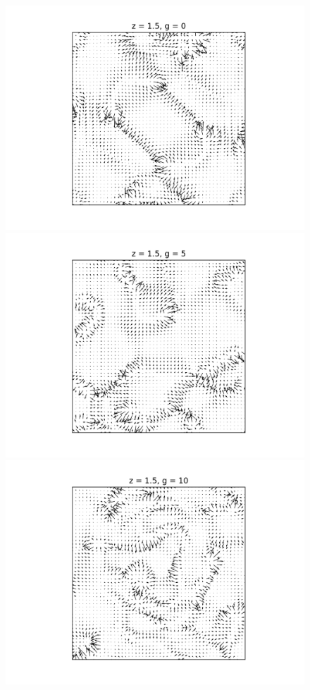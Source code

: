 \documentclass[a4paper,11pt]{article}
\begin{document}
\begin{figure}[!htb]
  \includegraphics[trim={4cm 0 1cm 0cm},scale=0.5]{vel_1_5_g0.png}
\endminipage\hfill
{}
  \includegraphics[trim={4cm 0 1cm 0cm},scale=0.5]{vel_1_5_g5.png}
\endminipage\hfill
{}
  \includegraphics[trim={4cm 0 0cm 0cm},scale=0.5]{vel_1_5_g10.png}

\end{figure}
\end{document}
